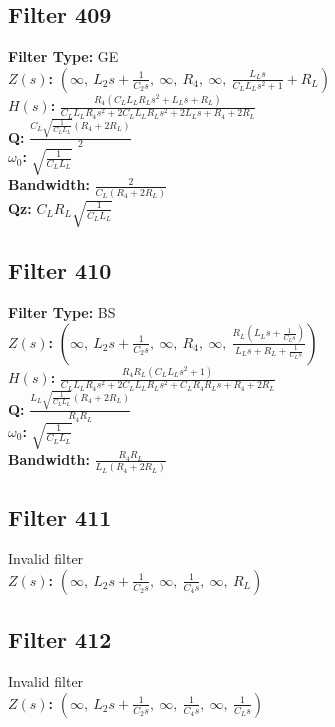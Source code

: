 \documentclass{article}
\begin{document}
\subsection*{Filter 409}
\textbf{Filter Type:} GE \\ 
\textbf{$Z(s)$:} $\left( \infty, \  L_{2} s + \frac{1}{C_{2} s}, \  \infty, \  R_{4}, \  \infty, \  \frac{L_{L} s}{C_{L} L_{L} s^{2} + 1} + R_{L}\right)$ \\ 
\textbf{$H(s)$:} $\frac{R_{4} \left(C_{L} L_{L} R_{L} s^{2} + L_{L} s + R_{L}\right)}{C_{L} L_{L} R_{4} s^{2} + 2 C_{L} L_{L} R_{L} s^{2} + 2 L_{L} s + R_{4} + 2 R_{L}}$ \\ 
\textbf{Q:} $\frac{C_{L} \sqrt{\frac{1}{C_{L} L_{L}}} \left(R_{4} + 2 R_{L}\right)}{2}$ \\ 
\textbf{$\omega_0$:} $\sqrt{\frac{1}{C_{L} L_{L}}}$ \\ 
\textbf{Bandwidth:} $\frac{2}{C_{L} \left(R_{4} + 2 R_{L}\right)}$ \\ 
\textbf{Qz:} $C_{L} R_{L} \sqrt{\frac{1}{C_{L} L_{L}}}$ \\ 
\subsection*{Filter 410}
\textbf{Filter Type:} BS \\ 
\textbf{$Z(s)$:} $\left( \infty, \  L_{2} s + \frac{1}{C_{2} s}, \  \infty, \  R_{4}, \  \infty, \  \frac{R_{L} \left(L_{L} s + \frac{1}{C_{L} s}\right)}{L_{L} s + R_{L} + \frac{1}{C_{L} s}}\right)$ \\ 
\textbf{$H(s)$:} $\frac{R_{4} R_{L} \left(C_{L} L_{L} s^{2} + 1\right)}{C_{L} L_{L} R_{4} s^{2} + 2 C_{L} L_{L} R_{L} s^{2} + C_{L} R_{4} R_{L} s + R_{4} + 2 R_{L}}$ \\ 
\textbf{Q:} $\frac{L_{L} \sqrt{\frac{1}{C_{L} L_{L}}} \left(R_{4} + 2 R_{L}\right)}{R_{4} R_{L}}$ \\ 
\textbf{$\omega_0$:} $\sqrt{\frac{1}{C_{L} L_{L}}}$ \\ 
\textbf{Bandwidth:} $\frac{R_{4} R_{L}}{L_{L} \left(R_{4} + 2 R_{L}\right)}$ \\ 
\subsection*{Filter 411}
Invalid filter \\ 
\textbf{$Z(s)$:} $\left( \infty, \  L_{2} s + \frac{1}{C_{2} s}, \  \infty, \  \frac{1}{C_{4} s}, \  \infty, \  R_{L}\right)$ \\ 
\subsection*{Filter 412}
Invalid filter \\ 
\textbf{$Z(s)$:} $\left( \infty, \  L_{2} s + \frac{1}{C_{2} s}, \  \infty, \  \frac{1}{C_{4} s}, \  \infty, \  \frac{1}{C_{L} s}\right)$ \\ 
\end{document}
